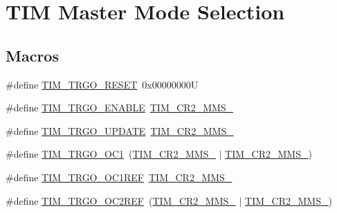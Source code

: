 \hypertarget{group___t_i_m___master___mode___selection}{}\section{T\+IM Master Mode Selection}
\label{group___t_i_m___master___mode___selection}
\subsection*{Macros}
\begin{DoxyCompactItemize}
\item 
\#define \mbox{\hyperlink{group___t_i_m___master___mode___selection_ga32a8e436f2c0818a657b0d3fcf4e872d}{T\+I\+M\+\_\+\+T\+R\+G\+O\+\_\+\+R\+E\+S\+ET}}~0x00000000U
\item 
\#define \mbox{\hyperlink{group___t_i_m___master___mode___selection_ga4ac300b0fd24d1e6532e5961680a39a9}{T\+I\+M\+\_\+\+T\+R\+G\+O\+\_\+\+E\+N\+A\+B\+LE}}~\mbox{\hyperlink{group___peripheral___registers___bits___definition_gaf3e55308e84106d6501201e66bd46ab6}{T\+I\+M\+\_\+\+C\+R2\+\_\+\+M\+M\+S\+\_}}
\item 
\#define \mbox{\hyperlink{group___t_i_m___master___mode___selection_ga27521aebd507e562fe7fba6dfc639a67}{T\+I\+M\+\_\+\+T\+R\+G\+O\+\_\+\+U\+P\+D\+A\+TE}}~\mbox{\hyperlink{group___peripheral___registers___bits___definition_ga4b1036929b0a4ba5bd5cced9b8e0f4c3}{T\+I\+M\+\_\+\+C\+R2\+\_\+\+M\+M\+S\+\_}}
\item 
\#define \mbox{\hyperlink{group___t_i_m___master___mode___selection_ga80aa9a9c41de509d99fc4cb492d6513f}{T\+I\+M\+\_\+\+T\+R\+G\+O\+\_\+\+O\+C1}}~(\mbox{\hyperlink{group___peripheral___registers___bits___definition_ga4b1036929b0a4ba5bd5cced9b8e0f4c3}{T\+I\+M\+\_\+\+C\+R2\+\_\+\+M\+M\+S\+\_}} $\vert$ \mbox{\hyperlink{group___peripheral___registers___bits___definition_gaf3e55308e84106d6501201e66bd46ab6}{T\+I\+M\+\_\+\+C\+R2\+\_\+\+M\+M\+S\+\_}})
\item 
\#define \mbox{\hyperlink{group___t_i_m___master___mode___selection_gaed715aa7ec4ad0f7f5d82dde6d964178}{T\+I\+M\+\_\+\+T\+R\+G\+O\+\_\+\+O\+C1\+R\+EF}}~\mbox{\hyperlink{group___peripheral___registers___bits___definition_gacb74a815afdd856d51cfcf1ddf3fce6a}{T\+I\+M\+\_\+\+C\+R2\+\_\+\+M\+M\+S\+\_}}
\item 
\#define \mbox{\hyperlink{group___t_i_m___master___mode___selection_gaaedc4b3f4c5c3c8b45a2cf1b73e33c0a}{T\+I\+M\+\_\+\+T\+R\+G\+O\+\_\+\+O\+C2\+R\+EF}}~(\mbox{\hyperlink{group___peripheral___registers___bits___definition_gacb74a815afdd856d51cfcf1ddf3fce6a}{T\+I\+M\+\_\+\+C\+R2\+\_\+\+M\+M\+S\+\_}} $\vert$ \mbox{\hyperlink{group___peripheral___registers___bits___definition_gaf3e55308e84106d6501201e66bd46ab6}{T\+I\+M\+\_\+\+C\+R2\+\_\+\+M\+M\+S\+\_}})

\end{DoxyCompactItemize}
